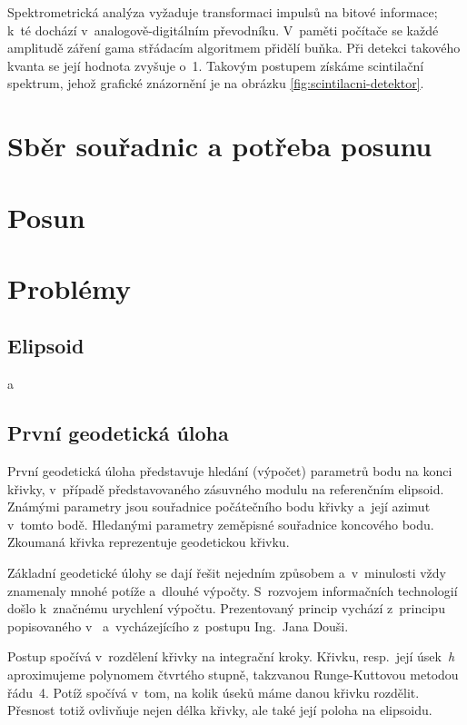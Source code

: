 Spektrometrická analýza vyžaduje transformaci impulsů na bitové informace; k~té dochází
v~analogově-digitálním převodníku. V~paměti počítače se každé amplitudě záření gama
střádacím algoritmem přidělí buňka. Při detekci takového kvanta se její hodnota zvyšuje o~1.
Takovým postupem získáme scintilační spektrum, jehož grafické
znázornění je na obrázku \ref{fig:scintilacni-detektor}. 

\section{Sběr souřadnic a potřeba posunu}
\label{potreba posunu}

\section{Posun}
\label{posun}


\section{Problémy}
\label{problemy}

\subsection{Elipsoid}
\label{elipsoid}

a

\subsection{První geodetická úloha}
\label{prvnigu}

První geodetická úloha představuje hledání (výpočet) parametrů bodu na konci křivky, v~případě
představovaného zásuvného modulu na referenčním elipsoid. Zná\-mými parametry jsou souřadnice počátečního
bodu křivky a~její azimut v~tomto bodě. Hledanými parametry zeměpisné souřadnice koncového bodu.
Zkoumaná křivka reprezentuje geodetickou křivku. 

Základní geodetické úlohy se dají řešit nejedním způsobem a~v~minulosti vždy znamenaly mnohé potíže
a~dlouhé výpočty. S~rozvojem informačních technologií došlo k~značnému urychlení výpočtu.
Prezentovaný princip vychází z~principu popisovaného v~\cite{vyssigeodezie} a~vycházejícího
z~postupu Ing.~Jana Douši. 

Postup spočívá v~rozdělení křivky na integrační kroky. Křivku, resp.~její úsek~\textit{h}
aproximujeme polynomem čtvrtého stupně, takzvanou Runge-Kuttovou metodou řádu~4. Potíž spočívá v~tom,
na kolik úseků máme danou křivku rozdělit. Přesnost totiž ovlivňuje nejen délka křivky, ale také její
poloha na elipsoidu. 

